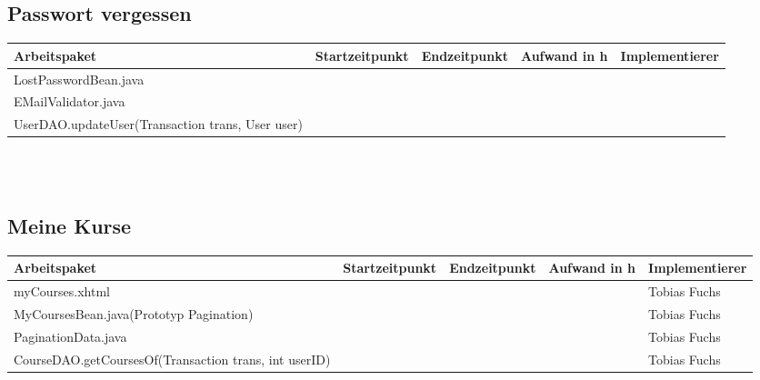 \begin{landscape}
\subsection{Passwort vergessen}
\begin{tabular}{|p{10cm}|p{4cm}|p{3cm}|p{3cm}|p{3cm}|}
	\hline  \textbf{Arbeitspaket} & \textbf{Startzeitpunkt} & \textbf{Endzeitpunkt} & \textbf{Aufwand in h} & \textbf{Implementierer} \\ 
	\hline   LostPasswordBean.java                                &                            &                             &                     &\\
	\hline   EMailValidator.java                                  &                            &                             &                     &\\ 
	\hline   UserDAO.updateUser(Transaction trans, User user)     &                            &                             &                     &\\ 
	\hline 
\end{tabular} \ \\
\ \\

\subsection{Meine Kurse}
\begin{tabular}{|p{10cm}|p{4cm}|p{3cm}|p{3cm}|p{3cm}|}
	\hline  \textbf{Arbeitspaket} & \textbf{Startzeitpunkt} & \textbf{Endzeitpunkt} & \textbf{Aufwand in h} & \textbf{Implementierer} \\ 
	\hline   myCourses.xhtml                                       &                            &                             &                     & Tobias Fuchs\\
	\hline   MyCoursesBean.java(Prototyp Pagination)               &                            &                             &                     & Tobias Fuchs\\ 
	\hline   PaginationData.java                                   &                            &                             &                     & Tobias Fuchs\\ 
	\hline   CourseDAO.getCoursesOf(Transaction trans, int userID) &                            &                             &                     & Tobias Fuchs\\ 
	\hline 
\end{tabular} \ \\
\ \\


\end{landscape}
